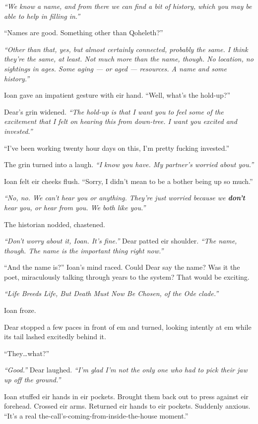 \emph{``We know a name, and from there we can find a bit of history, which you may be able to help in filling in.''}

``Names are good. Something other than Qoheleth?''

\emph{``Other than that, yes, but almost certainly connected, probably the same. I think they're the same, at least. Not much more than the name, though. No location, no sightings in ages. Some aging — or aged — resources. A name and some history.''}

Ioan gave an impatient gesture with eir hand. ``Well, what's the hold-up?''

Dear's grin widened. \emph{``The hold-up is that I want you to feel some of the excitement that I felt on hearing this from down-tree. I want you excited and invested.''}

``I've been working twenty hour days on this, I'm pretty fucking invested.''

The grin turned into a laugh. \emph{``I know you have. My partner's worried about you.''}

Ioan felt eir cheeks flush. ``Sorry, I didn't mean to be a bother being up so much.''

\emph{``No, no. We can't hear you or anything. They're just worried because we \textbf{don't} hear you, or hear from you. We both like you.''}

The historian nodded, chastened.

\emph{``Don't worry about it, Ioan. It's fine.''} Dear patted eir shoulder. \emph{``The name, though. The name is the important thing right now.''}

``And the name is?'' Ioan's mind raced. Could Dear say the name? Was it the poet, miraculously talking through years to the system? That would be exciting.

\emph{``Life Breeds Life, But Death Must Now Be Chosen, of the Ode clade.''}

Ioan froze.

Dear stopped a few paces in front of em and turned, looking intently at em while its tail lashed excitedly behind it.

``They\ldots{}what?''

\emph{``Good.''} Dear laughed. \emph{``I'm glad I'm not the only one who had to pick their jaw up off the ground.''}

Ioan stuffed eir hands in eir pockets. Brought them back out to press against eir forehead. Crossed eir arms. Returned eir hands to eir pockets. Suddenly anxious. ``It's a real the-call's-coming-from-inside-the-house moment.''

